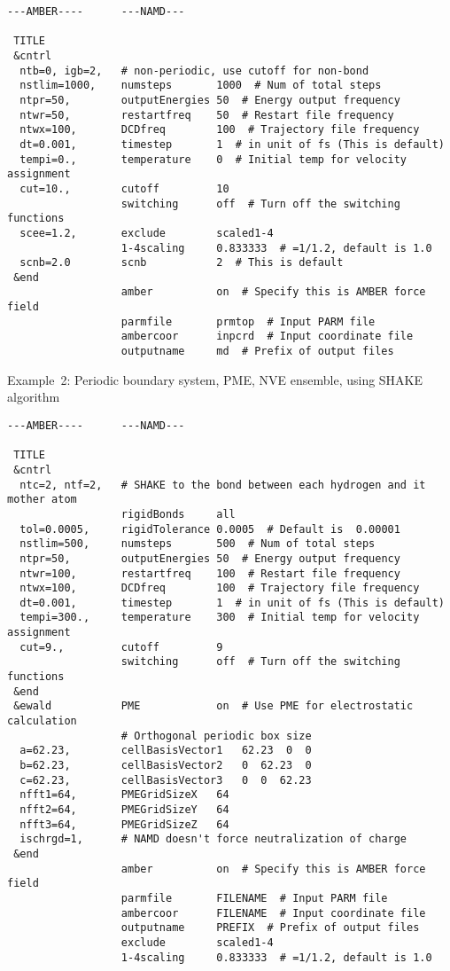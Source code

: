 \begin{verbatim}
---AMBER----      ---NAMD---

 TITLE
 &cntrl
  ntb=0, igb=2,   # non-periodic, use cutoff for non-bond
  nstlim=1000,    numsteps       1000  # Num of total steps
  ntpr=50,        outputEnergies 50  # Energy output frequency
  ntwr=50,        restartfreq    50  # Restart file frequency
  ntwx=100,       DCDfreq        100  # Trajectory file frequency
  dt=0.001,       timestep       1  # in unit of fs (This is default)
  tempi=0.,       temperature    0  # Initial temp for velocity assignment
  cut=10.,        cutoff         10
                  switching      off  # Turn off the switching functions
  scee=1.2,       exclude        scaled1-4
                  1-4scaling     0.833333  # =1/1.2, default is 1.0
  scnb=2.0        scnb           2  # This is default
 &end
                  amber          on  # Specify this is AMBER force field
                  parmfile       prmtop  # Input PARM file
                  ambercoor      inpcrd  # Input coordinate file
                  outputname     md  # Prefix of output files
\end{verbatim}

\noindent Example~2: Periodic boundary system, PME, NVE ensemble,
using SHAKE algorithm

\begin{verbatim}
---AMBER----      ---NAMD---

 TITLE
 &cntrl
  ntc=2, ntf=2,   # SHAKE to the bond between each hydrogen and it mother atom
                  rigidBonds     all
  tol=0.0005,     rigidTolerance 0.0005  # Default is  0.00001
  nstlim=500,     numsteps       500  # Num of total steps
  ntpr=50,        outputEnergies 50  # Energy output frequency
  ntwr=100,       restartfreq    100  # Restart file frequency
  ntwx=100,       DCDfreq        100  # Trajectory file frequency
  dt=0.001,       timestep       1  # in unit of fs (This is default)
  tempi=300.,     temperature    300  # Initial temp for velocity assignment
  cut=9.,         cutoff         9
                  switching      off  # Turn off the switching functions
 &end
 &ewald           PME            on  # Use PME for electrostatic calculation
                  # Orthogonal periodic box size
  a=62.23,        cellBasisVector1   62.23  0  0
  b=62.23,        cellBasisVector2   0  62.23  0
  c=62.23,        cellBasisVector3   0  0  62.23
  nfft1=64,       PMEGridSizeX   64
  nfft2=64,       PMEGridSizeY   64
  nfft3=64,       PMEGridSizeZ   64
  ischrgd=1,      # NAMD doesn't force neutralization of charge
 &end
                  amber          on  # Specify this is AMBER force field
                  parmfile       FILENAME  # Input PARM file
                  ambercoor      FILENAME  # Input coordinate file
                  outputname     PREFIX  # Prefix of output files
                  exclude        scaled1-4
                  1-4scaling     0.833333  # =1/1.2, default is 1.0
\end{verbatim}

